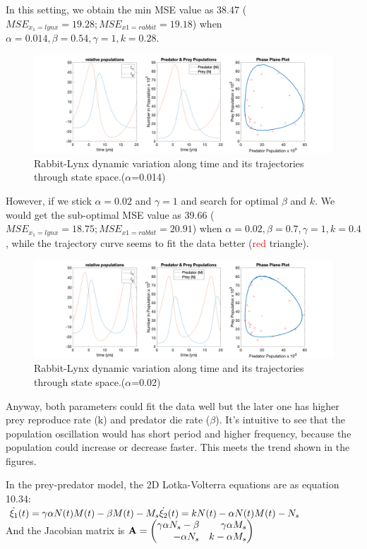 \documentclass[12pt,a4paper]{article}
\begin{document}
In this setting, we obtain the min MSE value as 38.47 ($MSE_{x_1=lynx}=19.28;MSE_{x1=rabbit}=19.18$) when $\alpha=0.014, \beta=0.54,\gamma=1,k=0.28$. 
\begin{figure}[!ht]
    \includegraphics[width=\textwidth]{hw10_5_b.png}
    \caption{Rabbit-Lynx dynamic variation along time and its trajectories through state space.($\alpha$=0.014)}
\end{figure}

However, if we stick $\alpha=0.02$ and $\gamma=1$ and search for optimal $\beta$ and $k$. We would get the sub-optimal MSE value as 39.66 ($MSE_{x_1=lynx}=18.75;MSE_{x1=rabbit}=20.91$) when $\alpha=0.02, \beta=0.7,\gamma=1,k=0.4$, while the trajectory curve seems to fit the data better (\textcolor{red}{red} triangle). 
\begin{figure}[!ht]
    \includegraphics[width=\textwidth]{hw10_5_a.png}
    \caption{Rabbit-Lynx dynamic variation along time and its trajectories through state space.($\alpha$=0.02)}
\end{figure}

Anyway, both parameters could fit the data well but the later one has higher prey reproduce rate (k) and predator die rate ($\beta$). It's intuitive to see that the population oscillation would has short period and higher frequency, because the population could increase or decrease faster. This meets the trend shown in the figures. 

\newpage
{}
In the prey-predator model, the 2D Lotka-Volterra equations are as equation 10.34: \\
$\dot{\xi_1}(t)=\gamma\alpha N(t)M(t)-\beta M(t)-M_s\\
\dot{\xi_2}(t)=kN(t)-\alpha N(t)M(t)-N_s$\\
And the Jacobian matrix is $\mathbf{A}=\newvec{\gamma\alpha N_s-\beta&\gamma\alpha M_s\\-\alpha N_s & k-\alpha M_s}$
\end{document}
